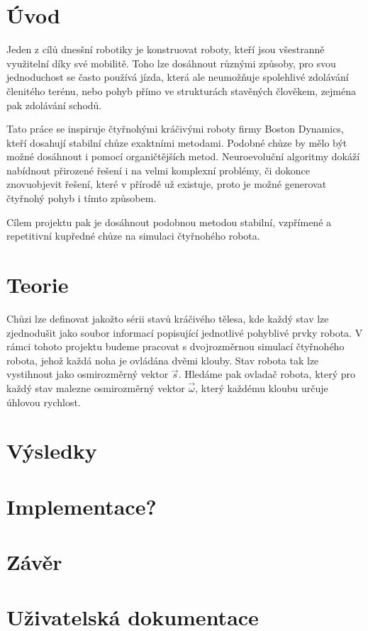 \documentclass[a4]{article}
\begin{document}
\section{Úvod} 
Jeden z cílů dnesšní robotiky je konstruovat roboty, kteří jsou všestranně využitelní díky své mobilitě. Toho lze dosáhnout různými způsoby, pro svou jednoduchost se často používá jízda, která ale neumožňuje spolehlivé zdolávání členitého terénu, nebo pohyb přímo ve strukturách stavěných člověkem, zejména pak zdolávání schodů.\par
Tato práce se inspiruje čtyřnohými kráčivými roboty firmy Boston Dynamics\cite{bostondynamics}, kteří dosahují stabilní chůze exaktními metodami.\cite{bdpaper} Podobné chůze by mělo být možné dosáhnout i pomocí organičtějších metod. Neuroevoluční algoritmy dokáží nabídnout přirozené řešení i na velmi komplexní problémy, či dokonce znovuobjevit řešení, které v přírodě už existuje, proto je možné generovat čtyřnohý pohyb i tímto způsobem.\cite{clunegait}\par
Cílem projektu pak je dosáhnout podobnou metodou stabilní, vzpřímené a repetitivní kupředné chůze na simulaci čtyřnohého robota.
 
\section{Teorie}
Chůzi lze definovat jakožto sérii stavů kráčivého tělesa, kde každý stav lze zjednodušit jako soubor informací popisující jednotlivé pohyblivé prvky robota. V rámci tohoto projektu budeme pracovat s dvojrozměrnou simulací čtyřnohého robota, jehož každá noha je ovládána dvěmi klouby. Stav robota tak lze vystihnout jako osmirozměrný vektor $\vec{s}$. Hledáme pak ovladač robota, který pro každý stav malezne osmirozměrný vektor $\vec{\omega}$, který každému kloubu určuje úhlovou rychlost.
\section{Výsledky} 
\section{Implementace?}%
\section{Závěr} 
\section{Uživatelská dokumentace} 
\end{document}

